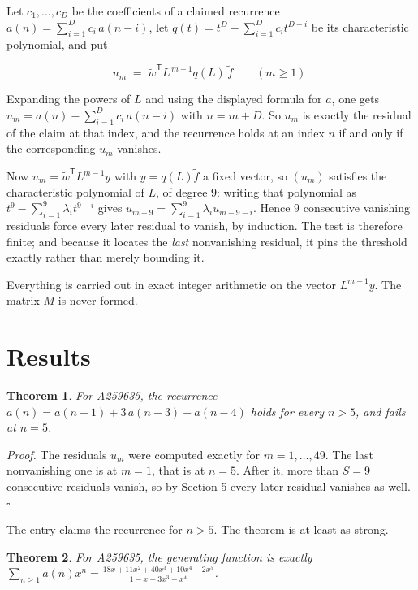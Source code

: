 \documentclass[11pt]{article}
\newtheorem{theorem}{Theorem}
\theoremstyle{definition}
\begin{document}
Let $c_1,\dots,c_D$ be the coefficients of a claimed recurrence $a(n) = \sum_{i=1}^{D} c_i\,a(n-i)$, let $q(t) = t^{D} - \sum_{i=1}^{D} c_i t^{D-i}$ be its characteristic polynomial, and put

\[u_m \;=\; \tilde w^{\mathsf T} L^{\,m-1} q(L)\,\tilde f \qquad (m \ge 1).\]

Expanding the powers of $L$ and using the displayed formula for $a$, one gets $u_m = a(n) - \sum_{i=1}^{D} c_i\,a(n-i)$ with $n = m + D$. So $u_m$ is exactly the residual of the claim at that index, and the recurrence holds at an index $n$ if and only if the corresponding $u_m$ vanishes.

Now $u_m = \tilde w^{\mathsf T} L^{m-1} y$ with $y = q(L)\tilde f$ a fixed vector, so $(u_m)$ satisfies the characteristic polynomial of $L$, of degree $9$: writing that polynomial as $t^{9} - \sum_{i=1}^{9} \lambda_i t^{9-i}$ gives $u_{m+9} = \sum_{i=1}^{9} \lambda_i u_{m+9-i}$. Hence $9$ consecutive vanishing residuals force every later residual to vanish, by induction. The test is therefore finite; and because it locates the {\itshape last} nonvanishing residual, it pins the threshold exactly rather than merely bounding it.

Everything is carried out in exact integer arithmetic on the vector $L^{m-1}y$. The matrix $M$ is never formed.

\section{Results}

\begin{theorem} For A259635, the recurrence $a(n) = a(n-1) + 3\,a(n-3) + a(n-4)$ holds for every $n > 5$, and fails at $n = 5$.\end{theorem}

{\itshape Proof.} The residuals $u_m$ were computed exactly for $m = 1,\dots,49$. The last nonvanishing one is at $m = 1$, that is at $n = 5$. After it, more than $S = 9$ consecutive residuals vanish, so by Section 5 every later residual vanishes as well. $\square$

The entry claims the recurrence for $n > 5$. The theorem is at least as strong.

\begin{theorem} For A259635, the generating function is exactly $\sum_{n\ge 1} a(n)x^n = \frac{18x + 11x^{2} + 40x^{3} + 10x^{4} - 2x^{5}}{1 - x - 3x^{3} - x^{4}}$.\end{theorem}
\end{document}
